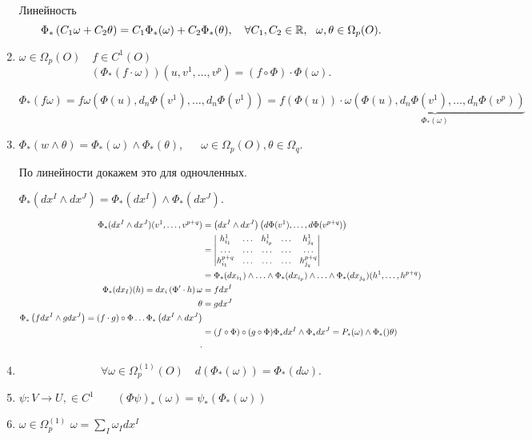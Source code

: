 \begin{statement}
    \begin{enumerate}
        \item [Линейность ]
        \[
        \Phi_*\left( C_1\omega + C_2\theta \right) = C_1\Phi_*(\omega) + C_2\Phi_*(\theta),~~~
        \forall C_1, C_2 \in \mathbb{R},~~ \omega, \theta \in \Omega_p (O).\] 
        \item $\omega\in \Omega_p(O)\quad f\in C^1(O)$
        \[
        (\Phi_*(f \cdot \omega))(u, v^1, \ldots, v^p) = (f\circ\Phi)\cdot \Phi(\omega)
        .\]  %
        
        $\Phi_*(f\omega) = f\omega(\Phi(u), d_n \Phi (v^1), \ldots, d_n \Phi(v^1)) 
        = f\left( \Phi(u) \right)  \cdot \underbrace{\omega\left( \Phi(u), d_n\Phi(v^1),\ldots, d_n\Phi(v^p) \right)}_{\Phi_*(\omega)}$
        
        
        \item $\Phi_* (w\wedge \theta) = \Phi_* (\omega) \wedge \Phi_* (\theta)$, ~~ $\omega\in \Omega_p (O), \theta \in \Omega_q$.
        
        По линейности докажем это для одночленных.
        
        $\Phi_* (dx^I \wedge dx^J) = \Phi_* (dx^I) \wedge \Phi_* (dx^J)$.

        \begin{align*}
        \Phi_*(dx^I \wedge dx^J)(v^1, \ldots, v^{p+q}) &= \left( dx^I \wedge dx^J \right) \left( d\Phi(v^1), \ldots, d\Phi(v^{p+q}) \right)  \\
        &= \begin{vmatrix}
            h_{i_1}^1& \ldots & h^1_{i_p} & \ldots & h^1_{j_q}\\
            \ldots&\ldots&\ldots&\ldots&\ldots\\
            h_{i_1}^{p+q}&\ldots&\ldots&\ldots& h_{j_q}^{p+q}
        \end{vmatrix} \\
        &= \Phi_*(dx_{i_1})\wedge \ldots \wedge \Phi_*(dx_{i_p})\wedge \ldots \wedge \Phi_*(dx_{j_q})(h^1, \ldots, h^{p+q}) \\
        \Phi_*(dx_I)(h) = dx_i \left( \Phi^{\prime} \cdot h \right)
        \omega &= fdx^I\\
        \theta &= gdx^J\\
        \Phi_*\left( fdx^I \wedge gdx^J \right) = (f\cdot g)\circ \Phi\ldots\Phi_*\left( dx^I\wedge dx^J \right)\\
        &= (f\circ \Phi)\circ (g\circ \Phi)\Phi_* dx^I\wedge \Phi_*dx^J = P_*(\omega)\wedge \Phi_*()\theta) \\
        .\end{align*}
        \item \[
        \forall \omega\in \Omega_p^{(1)}(O)\quad d\left( \Phi_*(\omega) \right) = \Phi_*\left( d\omega \right) 
        .\] 
        \item $\psi:V \to U, \in C^1\qquad \left( \Phi\psi \right) _*(\omega)  = \psi_*(\Phi_*(\omega))$
        \item $\omega\in \Omega_p^{(1)}$
        $\omega = \sum_I \omega_Idx^I$


\end{enumerate}
\end{statement}

